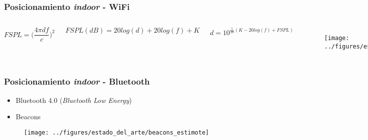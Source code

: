 \documentclass[mathserif]{beamer}
\begin{document}
\begin{frame}
\frametitle{Posicionamiento \textit{indoor} - WiFi}

\begin{columns}


\begin{equation*}
FSPL=\Bigg(\frac{4\pi df}{c}\Bigg)^2
\end{equation*}

\begin{equation*}
FSPL(dB)=20 log(d)+20 log(f) + K
\end{equation*}

\begin{equation*}
d=10^{\frac{1}{20}(K-20 log(f)+FSPL)}
\end{equation*}


\begin{figure}
\texttt{[image: ../figures/estado\_del\_arte/fspl]}
\end{figure}

\end{columns}

\end{frame}


\begin{frame}
\frametitle{Posicionamiento \textit{indoor} - Bluetooth}

\begin{itemize}
\item Bluetooth 4.0 (\textit{Bluetooth Low Energy})
\item Beacons
\end{itemize}

\begin{figure}
\texttt{[image: ../figures/estado\_del\_arte/beacons\_estimote]}
\end{figure}

\end{frame}

\end{document}

